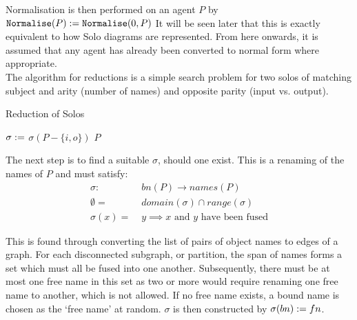         Normalisation is then performed on an agent $P$ by $\texttt{Normalise}(P) := \texttt{Normalise}(0, P)$
        It will be seen later that this is exactly equivalent to how Solo diagrams are represented.
        From here onwards, it is assumed that any agent has already been converted to normal form where appropriate.\\

        The algorithm for reductions is a simple search problem for two solos of matching subject and arity (number of names) and opposite parity (input vs. output).
        \begin{breakablealgorithm}
            \caption{Reduction of Solos}
            \begin{algorithmic}[1]
                     
                         
                             
                                \State$\sigma :=$ 
                                    \State\Return$\sigma(P - \{i, o\})$
                                \EndIf
                            \EndIf
                        \EndFor
                    \EndFor
                    \State\Return$P$
                \EndFunction
            \end{algorithmic}
        \end{breakablealgorithm}

        The next step is to find a suitable $\sigma$, should one exist. This is a renaming of the names of $P$ and must satisfy:
        \begin{align*}
            \sigma : \; & bn(P) \rightarrow names(P) \\
            \emptyset = \; & domain(\sigma) \cap range(\sigma) \\
            \sigma(x) = \; & y \implies \text{$x$ and $y$ have been fused}
        \end{align*}

        This is found through converting the list of pairs of object names to edges of a graph.
        For each disconnected subgraph, or partition, the span of names forms a set which must all be fused into one another.
        Subsequently, there must be at most one free name in this set as two or more would require renaming one free name to another, which is not allowed.
        If no free name exists, a bound name is chosen as the `free name' at random.
        $\sigma$ is then constructed by $\sigma(bn) := fn$.

